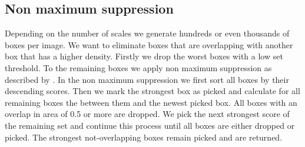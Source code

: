 \subsection{Non maximum suppression}
\label{sec:pipeline:eval:nms}
Depending on the number of scales we generate hundreds or even thousands of boxes per image. We want to eliminate boxes that are overlapping with another box that has a higher density. Firstly we drop the worst boxes with a low set threshold. To the remaining boxes we apply non maximum suppression as described by \citet{felzenszwalb_discriminatively_2008}. In the non maximum suppression we first sort all boxes by their descending scores. Then we mark the strongest box as picked and calculate for all remaining boxes the between them and the newest picked box. All boxes with an overlap in area of 0.5 or more are dropped. We pick the next strongest score of the remaining set and continue this process until all boxes are either dropped or picked. The strongest not-overlapping boxes remain picked and are returned. 
